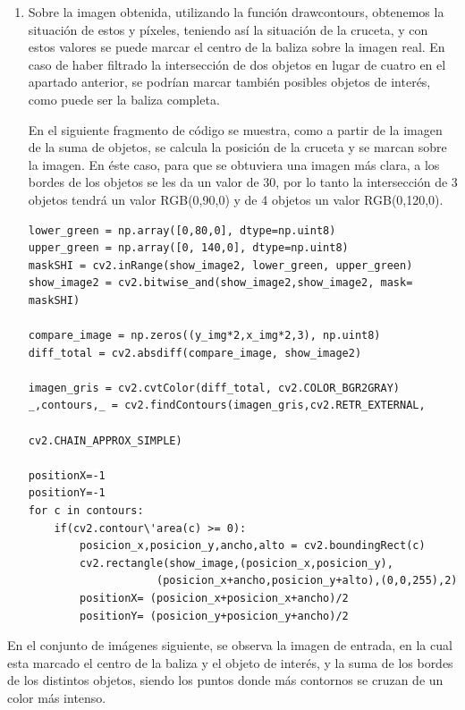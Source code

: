 \begin{enumerate}
	\item Sobre la imagen obtenida, utilizando la funci\'on drawcontours, obtenemos la situaci\'on de estos y p\'ixeles, teniendo as\'i la situaci\'on de la cruceta, y con estos valores se puede marcar el centro de la baliza sobre la imagen real. En caso de haber filtrado la intersecci\'on de dos objetos en lugar de cuatro en el apartado anterior, se podr\'ian marcar tambi\'en posibles objetos de inter\'es, como puede ser la baliza completa. 

\hspace{1 cm}En el siguiente fragmento de c\'odigo se muestra, como a partir de la imagen de la suma de objetos, se calcula la posici\'on de la cruceta y se marcan sobre la imagen. En \'este caso, para que se obtuviera una imagen m\'as clara, a los bordes de los objetos se les da un valor de 30, por lo tanto la intersecci\'on de 3 objetos tendr\'a un valor RGB(0,90,0) y de 4 objetos un valor RGB(0,120,0).

\begin{lstlisting}[backgroundcolor=\color{yellow}]
lower_green = np.array([0,80,0], dtype=np.uint8) 
upper_green = np.array([0, 140,0], dtype=np.uint8) 
maskSHI = cv2.inRange(show_image2, lower_green, upper_green)
show_image2 = cv2.bitwise_and(show_image2,show_image2, mask= maskSHI)

compare_image = np.zeros((y_img*2,x_img*2,3), np.uint8)
diff_total = cv2.absdiff(compare_image, show_image2)

imagen_gris = cv2.cvtColor(diff_total, cv2.COLOR_BGR2GRAY)
_,contours,_ = cv2.findContours(imagen_gris,cv2.RETR_EXTERNAL, 
                                             cv2.CHAIN_APPROX_SIMPLE)

positionX=-1
positionY=-1
for c in contours:
    if(cv2.contour\'area(c) >= 0):
        posicion_x,posicion_y,ancho,alto = cv2.boundingRect(c) 
        cv2.rectangle(show_image,(posicion_x,posicion_y),
                    (posicion_x+ancho,posicion_y+alto),(0,0,255),2)
        positionX= (posicion_x+posicion_x+ancho)/2
        positionY= (posicion_y+posicion_y+ancho)/2
\end{lstlisting}

\end{enumerate}

\hspace{1 cm} En el conjunto de im\'agenes siguiente, se observa la imagen de entrada, en la cual esta marcado el centro de la baliza y el objeto de inter\'es, y la suma de los bordes de los distintos objetos, siendo los puntos donde m\'as contornos se cruzan de un color m\'as intenso. 

